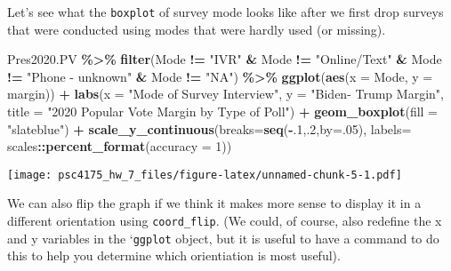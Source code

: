 \documentclass[
]{article}
\newenvironment{Shaded}{\begin{snugshade}}{\end{snugshade}}
\newcommand{\AttributeTok}[1]{\textcolor[rgb]{0.13,0.29,0.53}{#1}}
\newcommand{\DecValTok}[1]{\textcolor[rgb]{0.00,0.00,0.81}{#1}}
\newcommand{\FunctionTok}[1]{\textcolor[rgb]{0.13,0.29,0.53}{\textbf{#1}}}
\newcommand{\NormalTok}[1]{#1}
\newcommand{\SpecialCharTok}[1]{\textcolor[rgb]{0.81,0.36,0.00}{\textbf{#1}}}
\newcommand{\StringTok}[1]{\textcolor[rgb]{0.31,0.60,0.02}{#1}}
\begin{document}
Let's see what the \texttt{boxplot} of survey mode looks like after we
first drop surveys that were conducted using modes that were hardly used
(or missing).

\begin{Shaded}
\begin{Highlighting}[]
\NormalTok{Pres2020.PV }\SpecialCharTok{\%\textgreater{}\%} 
  \FunctionTok{filter}\NormalTok{(Mode }\SpecialCharTok{!=} \StringTok{"IVR"} \SpecialCharTok{\&}\NormalTok{ Mode }\SpecialCharTok{!=} \StringTok{"Online/Text"} \SpecialCharTok{\&}\NormalTok{ Mode }\SpecialCharTok{!=} \StringTok{"Phone {-} unknown"} \SpecialCharTok{\&}\NormalTok{ Mode }\SpecialCharTok{!=} \StringTok{"NA"}\NormalTok{) }\SpecialCharTok{\%\textgreater{}\%}
  \FunctionTok{ggplot}\NormalTok{(}\FunctionTok{aes}\NormalTok{(}\AttributeTok{x =}\NormalTok{ Mode, }\AttributeTok{y =}\NormalTok{ margin)) }\SpecialCharTok{+} 
    \FunctionTok{labs}\NormalTok{(}\AttributeTok{x =} \StringTok{"Mode of Survey Interview"}\NormalTok{,}
         \AttributeTok{y =} \StringTok{"Biden{-} Trump Margin"}\NormalTok{,}
         \AttributeTok{title =} \StringTok{"2020 Popular Vote Margin by Type of Poll"}\NormalTok{) }\SpecialCharTok{+}
    \FunctionTok{geom\_boxplot}\NormalTok{(}\AttributeTok{fill =} \StringTok{"slateblue"}\NormalTok{) }\SpecialCharTok{+}
    \FunctionTok{scale\_y\_continuous}\NormalTok{(}\AttributeTok{breaks=}\FunctionTok{seq}\NormalTok{(}\SpecialCharTok{{-}}\NormalTok{.}\DecValTok{1}\NormalTok{,.}\DecValTok{2}\NormalTok{,}\AttributeTok{by=}\NormalTok{.}\DecValTok{05}\NormalTok{),}
                     \AttributeTok{labels=}\NormalTok{ scales}\SpecialCharTok{::}\FunctionTok{percent\_format}\NormalTok{(}\AttributeTok{accuracy =} \DecValTok{1}\NormalTok{))}
\end{Highlighting}
\end{Shaded}

\texttt{[image: psc4175\_hw\_7\_files/figure-latex/unnamed-chunk-5-1.pdf]}

We can also flip the graph if we think it makes more sense to display it
in a different orientation using \texttt{coord\_flip}. (We could, of
course, also redefine the x and y variables in the `\texttt{ggplot}
object, but it is useful to have a command to do this to help you
determine which orientiation is most useful).
\end{document}
